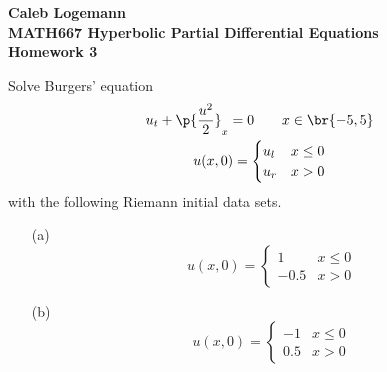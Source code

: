 \documentclass[11pt, oneside]{article}
\begin{document}
\noindent \textbf{\Large{Caleb Logemann \\
MATH667 Hyperbolic Partial Differential Equations \\
Homework 3
}}

%
Solve Burgers' equation
\begin{gather}
    u_t + \p{\frac{u^2}{2}}_x = 0 \qquad x \in \br{-5, 5} \\
    u(x, 0) = 
    \begin{cases}
      u_l & x \le 0 \\
      u_r & x > 0
    \end{cases}
\end{gather}
with the following Riemann initial data sets.

\begin{enumerate}
  \item[(a)]
    \[
      u(x, 0) =
      \begin{cases}
        1 & x \le 0 \\
        -0.5 & x > 0
      \end{cases}
    \]

  \item[(b)]
    \[
      u(x, 0) =
      \begin{cases}
        -1 & x \le 0 \\
        0.5 & x > 0
      \end{cases}
    \]
\end{enumerate}
\end{document}
